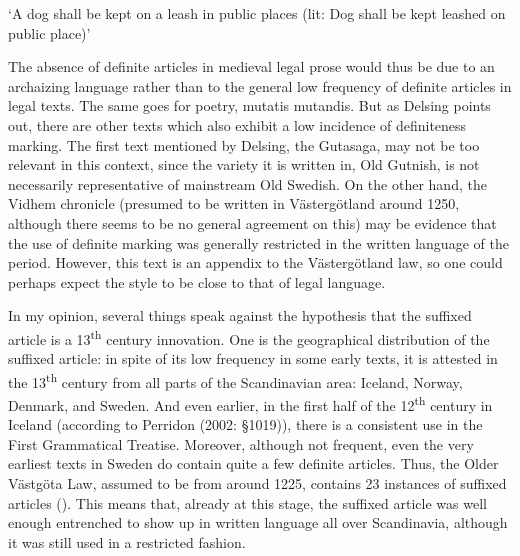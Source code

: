 \glt ‘A dog shall be kept on a leash in public places (lit: Dog shall be kept leashed on public place)’

\z

The absence of definite articles in medieval legal prose would thus be due to an archaizing language rather than to the general low frequency of definite articles in legal texts. The same goes for poetry, mutatis mutandis. But as Delsing points out, there are other texts which also exhibit a low incidence of definiteness marking. The first text mentioned by Delsing, the Gutasaga, may not be too relevant in this context, since the variety it is written in, Old Gutnish, is not necessarily representative of mainstream Old Swedish.  On the other hand, the Vidhem chronicle (presumed to be written in Västergötland around 1250, although there seems to be no general agreement on this) may be evidence that the use of definite marking was generally restricted in the written language of the period. However, this text is an appendix to the Västergötland law, so one could perhaps expect the style to be close to that of legal language. 


In my opinion, several things speak against the hypothesis that the suffixed article is a 13\textsuperscript{th} century innovation. One is the geographical distribution of the suffixed article: in spite of its low frequency in some early texts, it is attested in the 13\textsuperscript{th} century from all parts of the Scandinavian area: Iceland, Norway, Denmark, and Sweden.  And even earlier, in the first half of the 12\textsuperscript{th} century in Iceland (according to Perridon (2002: §1019)), there is a consistent use in the First Grammatical Treatise. Moreover, although not frequent, even the very earliest texts in Sweden do contain quite a few definite articles. Thus, the Older Västgöta Law, assumed to be from around 1225, contains 23 instances of suffixed articles (\citet[24]{Larm1936}). This means that, already at this stage, the suffixed article was well enough entrenched to show up in written language all over Scandinavia, although it was still used in a restricted fashion. 


